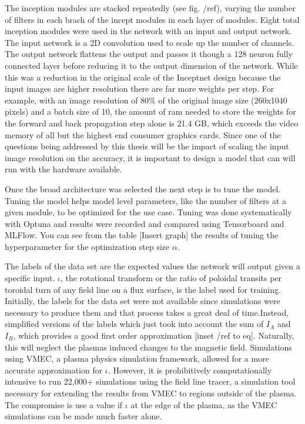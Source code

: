 The inception modules are stacked repeatedly (see fig. /ref{}), varying the number of filters in each brach of the incept modules in each layer of modules. Eight total inception modules were used in the network with an input and output network. The input network is a 2D convolution used to scale up the number of channels. The output network flattens the output and passes it though a 128 neuron fully connected layer before reducing it to the output dimension of the network. While this was a reduction in the original scale of the Inceptnet design because the input images are higher resolution there are far more weights per step. For example, with an image resolution of 80\% of the original image size (260x1040 pixels) and a batch size of 10, the amount of ram needed to store the weights for the forward and back propagation step alone is 21.4 GB, which exceeds the video memory of all but the highest end consumer graphics cards. Since one of the questions being addressed by this thesis will be the impact of scaling the input image resolution on the accuracy, it is important to design a model that can will run with the hardware available.

\label{sec:code:hyperparameters}

Once the broad architecture was selected the next step is to tune the model. Tuning the model helps model level parameters, like the number of filters at a given module, to be optimized for the use case. Tuning was done systematically with Optuna and results were recorded and compared using Tensorboard and MLFlow. You can see from the table [Insert graph] the results of tuning the hyperparameter for the optimization step size $\alpha$.

The labels of the data set are the expected values the network will output given a specific input.
$\iota$, the rotational transform or the ratio of poloidal transits per toroidal turn of any field line on a flux surface, is the label used for training. Initially, the labels for the data set were not available since simulations were necessary to produce them and that process takes a great deal of time.Instead, simplified versions of the labels which just took into account the sum of $I_A$ and $I_B$, which provides a good first order approximation [inset /ref{} to eq]. Naturally, this will neglect the plasmas induced changes to the magnetic field. Simulations using VMEC, a plasma physics simulation framework, allowed for a more accurate approximation for $\iota$. However, it is prohibitively computationally intensive to run 22,000+ simulations using the field line tracer, a simulation tool necessary for extending the results from VMEC to regions outside of the plasma. The compromise is use a value if $\iota$ at the edge of the plasma, as the VMEC simulations can be made much faster alone.


